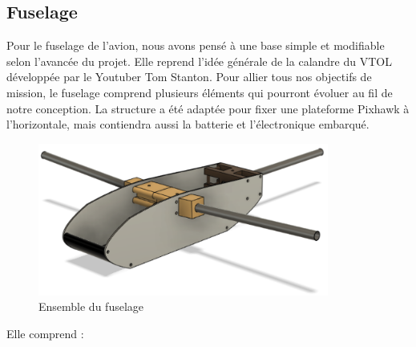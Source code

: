 \documentclass[a4paper,12pt,french]{report}
\begin{document}
\subsection{Fuselage}

Pour le fuselage de l’avion, nous avons pensé à une base simple et modifiable selon l’avancée du projet. Elle reprend l’idée générale de la calandre du VTOL développée par le Youtuber Tom Stanton. Pour allier tous nos objectifs de mission, le fuselage  comprend plusieurs éléments qui pourront évoluer au fil de notre conception. La structure a été adaptée pour fixer une plateforme Pixhawk à l’horizontale, mais contiendra aussi la batterie et l’électronique embarqué.

\begin{figure}[h]
    \centering
    \includegraphics[height=5cm]{figures/fuselageent.png}
    \caption{Ensemble du fuselage}
    \label{fus}
\end{figure}

Elle comprend :
\end{document}

